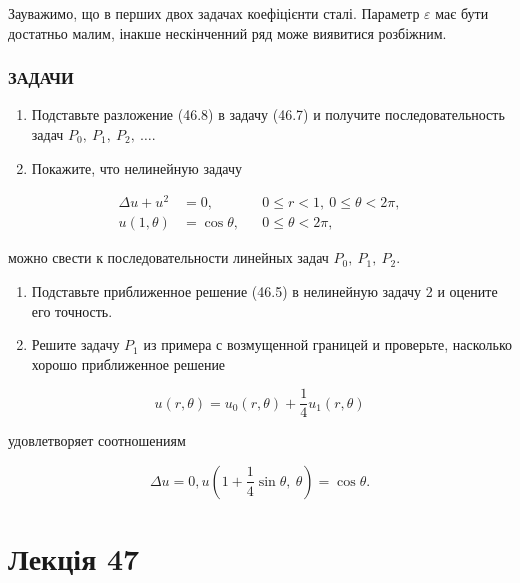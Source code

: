 \documentclass[
  ukrainian,
]{article}
\begin{document}
Зауважимо, що в перших двох задачах коефіцієнти сталі. Параметр
\(\varepsilon\) має бути достатньо малим, інакше нескінченний ряд може
виявитися розбіжним.

\subsubsection{ЗАДАЧИ}\label{ux437ux430ux434ux430ux447ux438}

\begin{enumerate}
\def\labelenumi{\arabic{enumi}.}
\item
  Подставьте разложение (46.8) в задачу (46.7) и получите
  последовательность задач \(P_0,\ P_1,\ P_2,\ \dots\).
\item
  Покажите, что нелинейную задачу
\end{enumerate}

\[
\begin{aligned}
\Delta u + u^2 &= 0, && 0 \leqslant r < 1,\ 0 \leqslant \theta < 2\pi, \\
u(1,\theta) &= \cos\theta, && 0 \leqslant \theta < 2\pi,
\end{aligned}
\]

можно свести к последовательности линейных задач \(P_0,\ P_1,\ P_2\).

\begin{enumerate}
\def\labelenumi{\arabic{enumi}.}
\setcounter{enumi}{2}
\item
  Подставьте приближенное решение (46.5) в нелинейную задачу 2 и оцените
  его точность.
\item
  Решите задачу \(P_1\) из примера с возмущенной границей и проверьте,
  насколько хорошо приближенное решение
\end{enumerate}

\[
u(r,\theta) = u_0(r,\theta) + \frac{1}{4}u_1(r,\theta)
\]

удовлетворяет соотношениям

\[
\Delta u = 0,
u\left(1 + \frac{1}{4}\sin\theta,\ \theta\right) = \cos\theta.
\]

\section{Лекція 47}\label{ux43bux435ux43aux446ux456ux44f-47}
\end{document}
